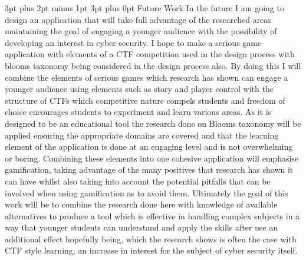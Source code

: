\documentclass[12pt,a4paper]{article}
\makeatletter
\renewcommand\subsection{\@startsection {subsection}{1}{2mm} %
                               {3pt plus 2pt minus 1pt} %
                               {3pt plus 0pt} %
                               {\normalfont\bfseries}}
\makeatother
\begin{document}
\subsection{Future Work} 
In the future I am going to design an application that will take full advantage of the researched areas maintaining the goal of engaging a younger audience with the possibility of developing an interest in cyber security. I hope to make a serious game application with elements of a CTF competition used in the design process with blooms taxonomy being considered in the design process also. By doing this I will combine the elements of serious games which research has shown can engage a younger audience using elements such as story and player control with the structure of CTFs which competitive nature compels students and freedom of choice encourages students to experiment and learn various areas. As it is designed to be an educational tool the research done on Blooms taxonomy will be applied ensuring the appropriate domains are covered and that the learning element of the application is done at an engaging level and is not overwhelming or boring. Combining these elements into one cohesive application will emphasise gamification, taking advantage of the many positives that research has shown it can have whilst also taking into account the potential pitfalls that can be involved when using gamification as to avoid them. Ultimately the goal of this work will be to combine the research done here with knowledge of available alternatives to produce a tool which is effective in handling complex subjects in a way that younger students can understand and apply the skills after use an additional effect hopefully being, which the research shows is often the case with CTF style learning, an increase in interest for the subject of cyber security itself.
\end{document}
